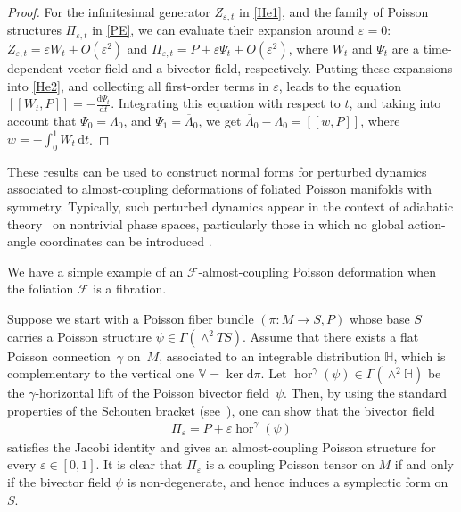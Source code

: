 \documentclass[10pt,a4paper]{amsart}
\numberwithin{equation}{section}
\begin{document}
\begin{proof}
For the inf\/initesimal generator $Z_{\varepsilon,t}$ in \eqref{He1}, and the family of Poisson structures $\Pi_{\varepsilon,t}$ in \eqref{PE}, we can evaluate their expansion around $\varepsilon =0$: $Z_{\varepsilon,t}=\varepsilon W_{t}+O(\varepsilon^{2})$ and $\Pi_{\varepsilon,t}=P+\varepsilon\Psi _{t}+O(\varepsilon^{2})$, where $W_{t}$ and $\Psi_{t}$ are a time-dependent vector f\/ield and a bivector f\/ield, respectively. Putting these expansions into \eqref{He2}, and collecting all f\/irst-order terms in $\varepsilon$, leads to the equation $[\![W_{t},P]\!]=-\frac{\mathrm{d}\Psi_{t}}{\mathrm{d}t}$. Integrating this equation with respect to $t$, and taking into account that $\Psi_{0}=\Lambda_{0}$, and $\Psi_{1}=\overline{\Lambda}_{0}$, we get $\overline{\Lambda}_{0}-\Lambda_{0}=[\![w,P]\!]$, where $w=-\int_{0}^{1}W_{t}\,\mathrm{d}t$.
\end{proof}
\begin{Remark}\label{lastrem}
These results can be used to construct normal forms for perturbed dynamics associated to almost-coupling deformations of foliated Poisson
manifolds with symmetry. Typically, such perturbed dynamics appear in the context of adiabatic theory~\cite{ArKN-88} on nontrivial phase
spaces, particularly those in which no global action-angle coordinates can be introduced \cite{MJYu-13,MJYu-13a,MYU-16}.
\end{Remark}
We have a simple example of an $\mathcal{F}$-almost-coupling Poisson deformation when the foliation $\mathcal{F}$ is a f\/ibration.
\begin{Example}\label{examp51}
Suppose we start with a Poisson f\/iber bundle $(\pi\colon M\rightarrow S,P)$ whose base $S$ carries a Poisson structure $\psi\in\Gamma(\wedge^{2}TS)$. Assume that there exists a f\/lat Poisson connection~$\gamma$ on~$M$, associated to an integrable distribution $\mathbb{H}$, which is complementary to the vertical one $\mathbb{V}=\ker \mathrm{d}\pi$. Let $\operatorname{hor}^{\gamma}(\psi)\in \Gamma(\wedge^{2}\mathbb{H})$ be the $\gamma$-horizontal lift of the Poisson bivector f\/ield~$\psi$. Then, by using the standard properties of the Schouten bracket (see~\cite{Va-94}), one can show that the bivector f\/ield
\begin{gather}\label{FC}
\Pi_{\varepsilon}=P+\varepsilon\operatorname{hor}^{\gamma}(\psi)
\end{gather}
satisf\/ies the Jacobi identity and gives an almost-coupling Poisson structure for every $\varepsilon\in [0,1]$. It is clear that $\Pi_{\varepsilon}$ is a coupling Poisson tensor on $M$ if and only if the bivector f\/ield $\psi$ is non-degenerate, and hence induces a symplectic form on $S$.
\end{Example}
\end{document}
